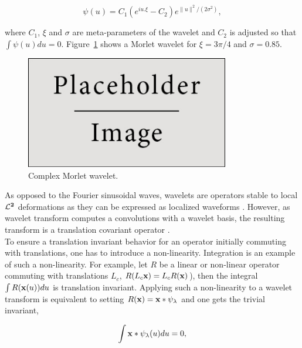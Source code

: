 \documentclass[a4paper,11pt]{report}
\begin{document}
      \begin{equation*} 
				\label{eq:Morlet wavelet}
				\psi(u) = C_{1}(e^{iu.\xi} - C_{2}) e^{\|u\|^{2}/(2 \sigma^{2})},
      \end{equation*}

      where $C_{1}$, $\xi$ and $\sigma$ are meta-parameters of the wavelet and $C_{2}$ is adjusted so that $\int \psi(u) du = 0$. Figure~\ref{fig:Morlet wavelet} shows a Morlet wavelet for  $\xi= 3\pi/4$ and $\sigma=0.85$.\\
      
      \begin{figure}
				\begin{center}
					\includegraphics[width=3.5in]{placeholder.jpg}
					\caption{Complex Morlet wavelet.}
					\label{fig:Morlet wavelet}
				\end{center}	
      \end{figure}
      
      As opposed to the Fourier sinusoidal waves, wavelets are operators stable to local $\mathbf{\mathcal{L}^{2}}$ deformations as they can be expressed as localized waveforms \cite{mallat1999wavelet}. However, as wavelet transform computes a convolutions with a wavelet basis, the resulting transform is a translation covariant operator \cite{bruna2013invariant}.\\
        
      To ensure a translation invariant behavior for an operator initially commuting with translations, one has to introduce a non-linearity. Integration is an example of such a non-linearity. For example, let $R$ be a linear or non-linear operator commuting with translations $L_{c}$, \ie $R(L_{c}{\bf x}) = L_{c}R({\bf x})$), then the integral $\int R({\bf x}(u))du$ is  translation invariant. Applying such a non-linearity to a wavelet transform is equivalent to setting $R({\bf x}) = {\bf x} \ast \psi_{\lambda}$ and one gets the trivial invariant, 
      
      \begin{equation*}
				\label{eq:Trivial invariant}
				\int {\bf x} \ast \psi_{\lambda}(u)du = 0,
      \end{equation*}
      
\end{document}
